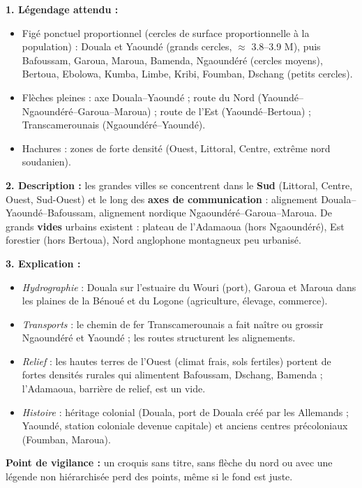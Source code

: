 \documentclass[11pt]{article}
\begin{document}
\begin{corrige}
\textbf{1. Légendage attendu :}
\begin{itemize}
    \item Figé ponctuel proportionnel (cercles de surface proportionnelle à la population) : Douala et Yaoundé (grands cercles, $\approx$ \num{3,8}--\num{3,9} M), puis Bafoussam, Garoua, Maroua, Bamenda, Ngaoundéré (cercles moyens), Bertoua, Ebolowa, Kumba, Limbe, Kribi, Foumban, Dschang (petits cercles).
    \item Flèches pleines : axe Douala–Yaoundé ; route du Nord (Yaoundé–Ngaoundéré–Garoua–Maroua) ; route de l'Est (Yaoundé–Bertoua) ; Transcamerounais (Ngaoundéré–Yaoundé).
    \item Hachures : zones de forte densité (Ouest, Littoral, Centre, extrême nord soudanien).
\end{itemize}

\textbf{2. Description :} les grandes villes se concentrent dans le \textbf{Sud} (Littoral, Centre, Ouest, Sud-Ouest) et le long des \textbf{axes de communication} : alignement Douala–Yaoundé–Bafoussam, alignement nordique Ngaoundéré–Garoua–Maroua. De grands \textbf{vides} urbains existent : plateau de l'Adamaoua (hors Ngaoundéré), Est forestier (hors Bertoua), Nord anglophone montagneux peu urbanisé.

\textbf{3. Explication :}
\begin{itemize}
    \item \emph{Hydrographie} : Douala sur l'estuaire du Wouri (port), Garoua et Maroua dans les plaines de la Bénoué et du Logone (agriculture, élevage, commerce).
    \item \emph{Transports} : le chemin de fer Transcamerounais a fait naître ou grossir Ngaoundéré et Yaoundé ; les routes structurent les alignements.
    \item \emph{Relief} : les hautes terres de l'Ouest (climat frais, sols fertiles) portent de fortes densités rurales qui alimentent Bafoussam, Dschang, Bamenda ; l'Adamaoua, barrière de relief, est un vide.
    \item \emph{Histoire} : héritage colonial (Douala, port de Douala créé par les Allemands ; Yaoundé, station coloniale devenue capitale) et anciens centres précoloniaux (Foumban, Maroua).
\end{itemize}
\textbf{Point de vigilance :} un croquis sans titre, sans flèche du nord ou avec une légende non hiérarchisée perd des points, même si le fond est juste.
\end{corrige}
\end{document}
